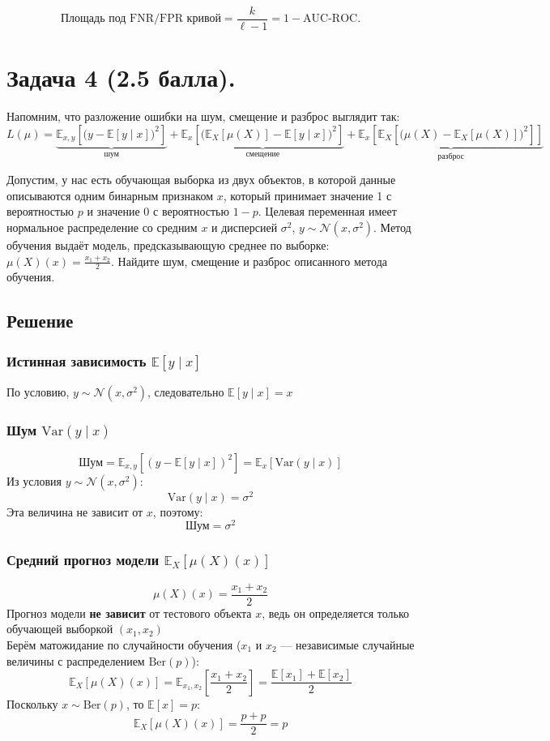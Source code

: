 \documentclass[12pt,a4paper]{article}
\begin{document}
\[
\text{Площадь под FNR/FPR кривой} = \frac{k}{\ell - 1} = 1 - \text{AUC-ROC}.
\]

\section*{Задача 4 (2.5 балла).}

Напомним, что разложение ошибки на шум, смещение и разброс выглядит так:
\[
L(\mu) = \underbrace{\mathbb{E}_{x,y}\!\left[\bigl(y - \mathbb{E}[y\mid x]\bigr)^2\right]}_{\text{шум}} +
\underbrace{\mathbb{E}_x\!\left[\bigl(\mathbb{E}_X[\mu(X)] - \mathbb{E}[y\mid x]\bigr)^2\right]}_{\text{смещение}} +
\underbrace{\mathbb{E}_x\!\left[\mathbb{E}_X\!\left[\bigl(\mu(X) - \mathbb{E}_X[\mu(X)]\bigr)^2\right]\right]}_{\text{разброс}}
\]

Допустим, у нас есть обучающая выборка из двух объектов, в которой данные описываются одним бинарным признаком $x$, который принимает значение 1 с вероятностью $p$ и значение 0 с вероятностью $1-p$. Целевая переменная имеет нормальное распределение со средним $x$ и дисперсией $\sigma^2$, $y \sim \mathcal{N}(x, \sigma^2)$. Метод обучения выдаёт модель, предсказывающую среднее по выборке: $\mu(X)(x) = \frac{x_1 + x_2}{2}$. Найдите шум, смещение и разброс описанного метода обучения.

\subsection*{Решение}


\subsubsection*{Истинная зависимость $\mathbb{E}[y\mid x]$}

По условию, $y \sim \mathcal{N}(x, \sigma^2)$, следовательно $\mathbb{E}[y \mid x] = x$\\

\subsubsection*{Шум $\text{Var}(y\mid x)$}

\[
\text{Шум} = \mathbb{E}_{x,y}\!\left[(y - \mathbb{E}[y\mid x])^2\right] = \mathbb{E}_x\!\left[\text{Var}(y\mid x)\right]
\]
Из условия $y \sim \mathcal{N}(x, \sigma^2)$:
\[
\text{Var}(y\mid x) = \sigma^2
\]
Эта величина не зависит от $x$, поэтому:
\[
\text{Шум} = \sigma^2
\]

\subsubsection*{Средний прогноз модели $\mathbb{E}_X[\mu(X)(x)]$}
\[
\mu(X)(x) = \frac{x_1 + x_2}{2}
\]
Прогноз модели \textbf{не зависит} от тестового объекта $x$, ведь он определяется только обучающей выборкой $(x_1, x_2)$\\[1mm]
Берём матожидание по случайности обучения ($x_1$ и $x_2$ --- независимые случайные величины с распределением $\text{Ber}(p)$):
\[
\mathbb{E}_X[\mu(X)(x)] = \mathbb{E}_{x_1, x_2}\!\left[\frac{x_1 + x_2}{2}\right] = \frac{\mathbb{E}[x_1] + \mathbb{E}[x_2]}{2}
\]
Поскольку $x \sim \text{Ber}(p)$, то $\mathbb{E}[x] = p$:
\[
\mathbb{E}_X[\mu(X)(x)] = \frac{p + p}{2} = p
\]
\end{document}
